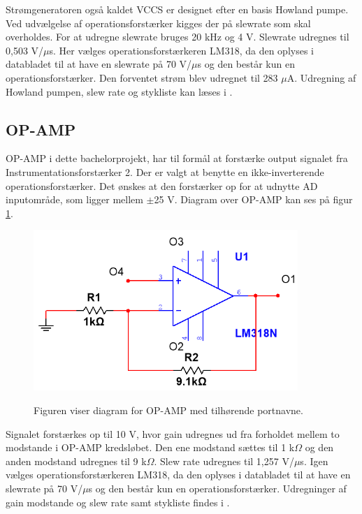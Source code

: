 Strømgeneratoren også kaldet VCCS er designet efter en basis Howland pumpe. Ved udvælgelse af operationsforstærker kigges der på slewrate som skal overholdes. For at udregne slewrate bruges 20 kHz og 4 V. Slewrate udregnes til 0,503 V/$\mu$s. Her vælges operationsforstærkeren LM318, da den oplyses i databladet til at have en slewrate på 70 V/$\mu$s og den består kun en operationsforstærker. Den forventet strøm blev udregnet til 283 $\mu$A. Udregning af Howland pumpen, slew rate og stykliste kan læses i .


\subsection{OP-AMP}
OP-AMP i dette bachelorprojekt, har til formål at forstærke output signalet fra Instrumentationsforstærker 2. Der er valgt at benytte en ikke-inverterende operationsforstærker. Det ønskes at den forstærker op for at udnytte AD inputområde, som ligger mellem $\pm$25 V. Diagram over OP-AMP kan ses på figur \ref{fig:IkkeInviterendeOpAmp}.



\begin{figure}[H]
\centering
{\includegraphics[width=10cm]
{Figure/IkkeInviterendeOpAmp}}
\caption{Figuren viser diagram for OP-AMP med tilhørende portnavne.}
\label{fig:IkkeInviterendeOpAmp}
\end{figure}

Signalet forstærkes op til 10 V, hvor gain udregnes ud fra forholdet mellem to modstande i OP-AMP kredsløbet. Den ene modstand sættes til 1 k$\Omega$ og den anden modstand udregnes til 9 k$\Omega$. Slew rate udregnes til 1,257 V/$\mu$s. Igen vælges operationsforstærkeren LM318, da den oplyses i databladet til at have en slewrate på 70 V/$\mu$s og den består kun en operationsforstærker. Udregninger af gain modstande og slew rate samt stykliste findes i .


